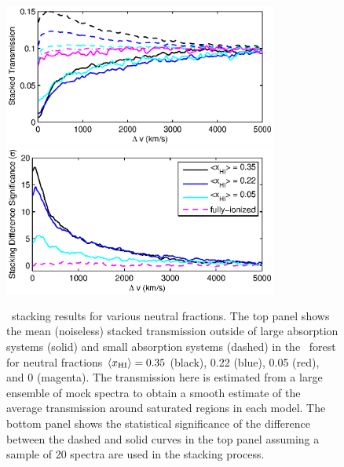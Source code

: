 \begin{figure}[h]
  \centering
  \includegraphics[width=9cm]{fig6a.eps}
  \includegraphics[width=9cm]{fig6b.eps}
  \caption{\lya\ stacking results for various neutral fractions. The top panel shows the mean (noiseless) stacked transmission outside of large absorption systems (solid) and small absorption systems (dashed) in the \lya\ forest for neutral fractions $\langle x_{\text{HI}}\rangle = 0.35$ (black), 0.22 (blue), 0.05 (red), and 0 (magenta). The transmission here is estimated from a large ensemble of mock spectra to obtain a smooth estimate
  of the average transmission around saturated regions in each model. 
  The bottom panel shows the statistical significance of the difference between the dashed and solid curves in the top panel assuming a sample of 20 spectra are used in the stacking process.}
  \label{fig:LyaResults}
\end{figure}


